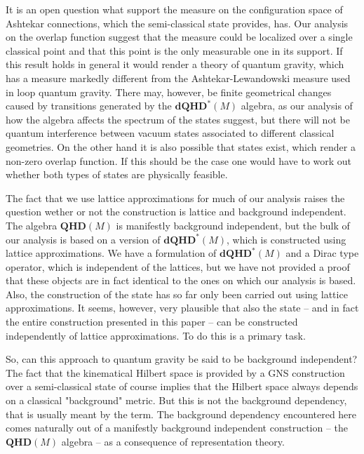 \documentclass[12pt]{article}
\begin{document}
It is an open question what support the measure on the configuration space of Ashtekar connections, which the semi-classical state provides, has. Our analysis on the overlap function suggest that the measure could be localized over a single classical point and that this point is the only measurable one in its support. If this result holds in general it would render a theory of quantum gravity, %
which has a measure markedly different from the Ashtekar-Lewandowski measure used in loop quantum gravity. There may, however, be finite geometrical changes caused by transitions generated by the $\mathbf{dQHD}^*(M) $ algebra, as our analysis of how the algebra affects the spectrum of the states suggest, but there will not be quantum interference between vacuum states associated to different classical geometries. On the other hand it is also possible that states exist, which render a non-zero overlap function. If this should be the case one would have to work out whether both types of states are physically feasible.





The fact that we use lattice approximations for much of our analysis raises the question wether or not the construction is lattice and background independent. The algebra $\mathbf{QHD}(M) $ is manifestly background independent, but the bulk of our analysis is based on a version of $\mathbf{dQHD}^*(M) $, which is constructed using lattice approximations. We have a formulation of $\mathbf{dQHD}^*(M) $ and a Dirac type operator, which is independent of the lattices, but we have not provided a proof that these objects are in fact identical to the ones on which our analysis is based. Also, the construction of the state has so far only been carried out using lattice approximations. It seems, however, very plausible that also the state -- and in fact the entire construction presented in this paper -- can be constructed independently of lattice approximations. To do this is a primary task.

So, can this approach to quantum gravity be said to be background independent? The fact that the kinematical Hilbert space is provided by a GNS construction over a semi-classical state of course implies that the Hilbert space always depends on a classical "background" metric. But this is not the background dependency, that is usually meant by the term. The background dependency encountered here comes naturally out of a manifestly background independent construction  -- the $\mathbf{QHD}(M) $ algebra -- as a consequence of representation theory. %
\end{document}
